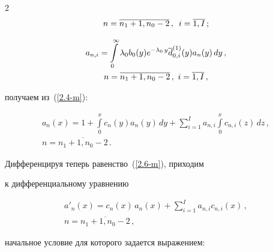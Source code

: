 \begin{multicols}{2}
\begin{multline*}
n=\overline{n_1+1,n_0-2}\,,\enskip


i=\overline{1,I}\,;


\end{multline*}





\vspace*{-12pt}





\noindent


\begin{multline*}


a_{n,i} = \int\limits_0^\infty \lambda_0 b_0(y) e^{-\lambda_0\, y} \d^{(1)}_{0,i}(y)


a_{n}(y) \, dy\,, \\ n=\overline{n_1+1,n_0-2}\,,


\ i=\overline{1,I}\,,


\end{multline*}


получаем из~(\ref{2.4-m}):


\begin{multline}


a_{n}(x)=1+\int\limits_0^x c_n(y) a_{n}(y)\, dy +


\sum\limits_{i=1}^I a_{n,i} \int\limits_0^x c_{n,i}(z)\, dz\,,


\\ n=\overline{n_1+1,n_0-2}\,.


\label{2.6-m}


\end{multline}




Дифференцируя теперь равенство~(\ref{2.6-m}), приходим


к дифференциальному уравнению


\begin{multline}


a'_{n}(x)= c_n(x)\, a_{n}(x) + \sum\limits_{i=1}^I a_{n,i} c_{n,i}(x)\,,


\\ n=\overline{n_1+1,n_0-2}\,,


\label{2.7-m}


\end{multline}


начальное условие для которого задается выражением:


\begin{equation}



\end{equation}
\end{multicols}
